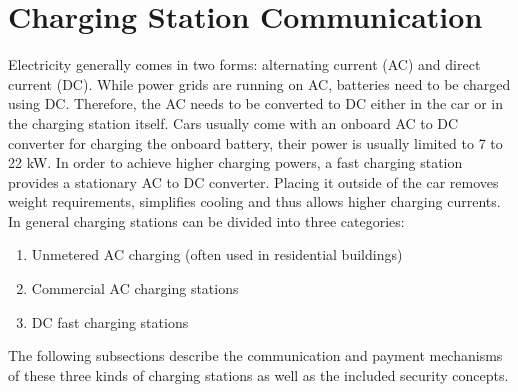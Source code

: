 \documentclass[conference,flushend]{iaria} %
\begin{document}
\section{Charging Station Communication}
Electricity generally comes in two forms: alternating current (AC) and direct current (DC).
While power grids are running on AC, batteries need to be charged using DC.
Therefore, the AC needs to be converted to DC either in the car or in the charging station itself.
Cars usually come with an onboard AC to DC converter for charging the onboard battery, their power is usually limited to 7 to 22 kW.
In order to achieve higher charging powers, a fast charging station provides a stationary AC to DC converter. Placing it outside of the car removes weight requirements, simplifies cooling and thus allows higher charging currents. \\
In general charging stations can be divided into three categories:
\begin{enumerate}
\item Unmetered AC charging (often used in residential buildings)
\item Commercial AC charging stations
\item DC fast charging stations
\end{enumerate}%
%
The following subsections describe the communication and payment mechanisms of these three kinds of charging stations as well as the included security concepts.
\end{document}
